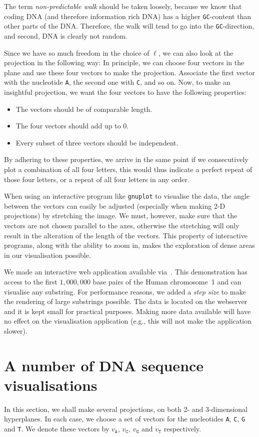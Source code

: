 \documentclass[oribibl]{lncs/llncs}
\begin{document}
\noindent
The term \emph{non-predictable walk} should be taken loosely, because we know
that coding DNA (and therefore information rich DNA) has a higher
\texttt{GC}-content than other parts of the DNA. Therefore, the walk will tend
to go into the \texttt{GC}-direction, and second, DNA is clearly not random.

Since we have so much freedom in the choice of $\ell$, we can also look at the
projection in the following way: In principle, we can choose four vectors in 
the plane and use these four vectors to make the projection. Associate the 
first vector with the nucleotide \texttt{A}, the second one with \texttt{C},
and so on. Now, to make an insightful projection, we want the four vectors to
have the following properties:
\begin{itemize}
\item The vectors should be of comparable length.
\item The four vectors should add up to $0$.
\item Every subset of three vectors should be independent.
\end{itemize}

\noindent
By adhering to these properties, we arrive in the same point if we
consecutively plot a combination of all four letters, this would thus indicate
a perfect repeat of those four letters, or a repeat of all four letters in any
order.

When using an interactive program like \texttt{gnuplot} to visualise the data,
the angle between the vectors can easily be adjusted (especially when making
2-D projections) by stretching the image. We must, however, make sure that the
vectors are not chosen parallel to the axes, otherwise the stretching will only
result in the alteration of the length of the vectors. This property of
interactive programs, along with the ability to zoom in, makes the exploration
of dense areas in our visualisation possible.

We made an interactive web application available via~\cite{DNAV}. This
demonstration has access to the first $1,\!000,\!000$ base pairs of the Human
chromosome~1 and can visualise any substring. For performance reasons, we added
a \emph{step size} to make the rendering of large substrings possible. The data
is located on the webserver and it is kept small for practical purposes. Making
more data available will have no effect on the visualisation application (e.g.,
this will not make the application slower).

\section{A number of DNA sequence visualisations}\label{dv:sec:ex}
In this section, we shall make several projections, on both 2- and
3-dimensional hyperplanes. In each case, we choose a set of vectors for the
nucleotides \texttt{A}, \texttt{C}, \texttt{G} and \texttt{T}. We denote these
vectors by $v_\mathtt{A}$, $v_\mathtt{C}$, $v_\mathtt{G}$ and $v_\mathtt{T}$
respectively.
\end{document}
